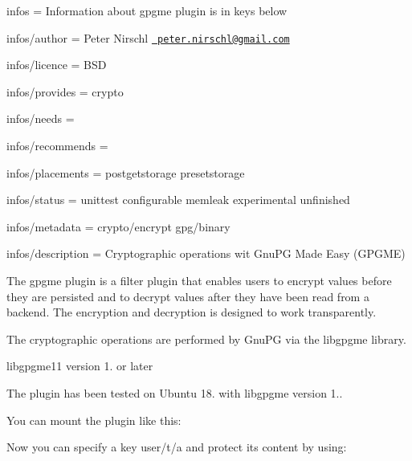 
\begin{DoxyItemize}
\item infos = Information about gpgme plugin is in keys below
\item infos/author = Peter Nirschl \href{mailto:peter.nirschl@gmail.com}{\texttt{ peter.\+nirschl@gmail.\+com}}
\item infos/licence = B\+SD
\item infos/provides = crypto
\item infos/needs =
\item infos/recommends =
\item infos/placements = postgetstorage presetstorage
\item infos/status = unittest configurable memleak experimental unfinished
\item infos/metadata = crypto/encrypt gpg/binary
\item infos/description = Cryptographic operations wit Gnu\+PG Made Easy (G\+P\+G\+ME)
\end{DoxyItemize}

The {\ttfamily gpgme} plugin is a filter plugin that enables users to encrypt values before they are persisted and to decrypt values after they have been read from a backend. The encryption and decryption is designed to work transparently.

The cryptographic operations are performed by Gnu\+PG via the {\ttfamily libgpgme} library.


\begin{DoxyItemize}
\item {\ttfamily libgpgme11} version 1. or later
\end{DoxyItemize}

The plugin has been tested on Ubuntu 18. with {\ttfamily libgpgme} version 1..

You can mount the plugin like this\+:


\begin{DoxyCode}{0}
\end{DoxyCode}


Now you can specify a key {\ttfamily user/t/a} and protect its content by using\+:


\begin{DoxyCode}{0}
\end{DoxyCode}


